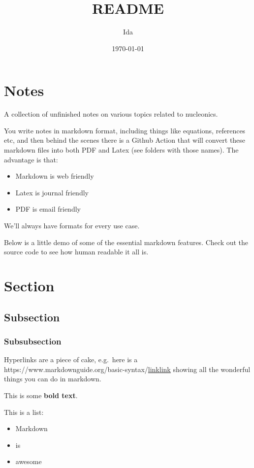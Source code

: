 \documentclass[
]{article}
\title{README}
\author{Ida}
\date{\today}  %
\let\oldhref\href
\renewcommand{\href}[2]{\ifx#1\urlprefix\oldhref{#1}{#2}\else\uline{\oldhref{#1}{#2}}\fi}
\renewcommand{\[}{\begin{equation}}
\renewcommand{\]}{\end{equation}}
\providecommand{\tightlist}{%
  \setlength{\itemsep}{0pt}\setlength{\parskip}{0pt}}
\begin{document}
\maketitle

\section{Notes}\label{notes}

A collection of unfinished notes on various topics related to
nucleonics.

You write notes in markdown format, including things like equations,
references etc, and then behind the scenes there is a Github Action that
will convert these markdown files into both PDF and Latex (see folders
with those names). The advantage is that:

\begin{itemize}
\tightlist
\item
  Markdown is web friendly
\item
  Latex is journal friendly
\item
  PDF is email friendly
\end{itemize}

We'll always have formats for every use case.

Below is a little demo of some of the essential markdown features. Check
out the source code to see how human readable it all is.

\section{Section}\label{section}

\subsection{Subsection}\label{subsection}

\subsubsection{Subsubsection}\label{subsubsection}

Hyperlinks are a piece of cake, e.g.~here is a
\href{https://www.markdownguide.org/basic-syntax/}{link} showing all the
wonderful things you can do in markdown.

This is some \textbf{bold text}.

This is a list:

\begin{itemize}
\tightlist
\item
  Markdown
\item
  is
\item
  awesome
\end{itemize}
\end{document}
